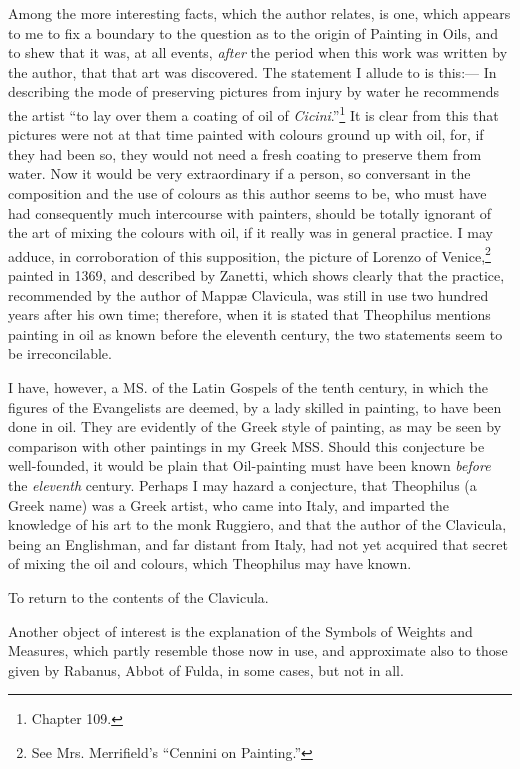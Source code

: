 \documentclass[a4paper, 11pt, oneside, polutonikogreek, italian]{article}
\begin{document}
Among the more interesting facts, which the author relates, is one, which appears to me to fix a boundary to the question as to the origin of Painting in Oils, and to shew that it was, at all events, \emph{after} the period when this work was written by the author, that that art was discovered. The statement I allude to is this:--- In describing the mode of preserving pictures from injury by water he recommends the artist ``to lay over them a coating of oil of \emph{Cicini}.''\footnote{Chapter 109.} It is clear from this that pictures were not at that time painted with colours ground up with oil, for, if they had been so, they would not need a fresh coating to preserve them from water. Now it would be very extraordinary if a person, so conversant in the composition and the use of colours as this author seems to be, who must have had consequently much intercourse with painters, should be totally ignorant of the art of mixing the colours with oil, if it really was in general practice. I may adduce, in corroboration of this supposition, the picture of Lorenzo of Venice,\footnote{See Mrs. Merrifield's ``Cennini on Painting.''} painted in 1369, and described by Zanetti, which shows clearly that the practice, recommended by the author of Mappæ Clavicula, was still in use two hundred years after his own time; therefore, when it is stated that Theophilus mentions painting in oil as known before the eleventh century, the two statements seem to be irreconcilable.

I have, however, a MS. of the Latin Gospels of the tenth century, in which the figures of the Evangelists are deemed, by a lady skilled in painting, to have been done in oil. They are evidently of the Greek style of painting, as may be seen by comparison with other paintings in my Greek MSS. Should this conjecture be well-founded, it would be plain that Oil-painting must have been known \emph{before} the \emph{eleventh} century. Perhaps I may hazard a conjecture, that Theophilus (a Greek name) was a Greek artist, who came into Italy, and imparted the knowledge of his art to the monk Ruggiero, and that the author of the Clavicula, being an Englishman, and far distant from Italy, had not yet acquired that secret of mixing the oil and colours, which Theophilus may have known.

To return to the contents of the Clavicula.

Another object of interest is the explanation of the Symbols of Weights and Measures, which partly resemble those now in use, and approximate also to those given by Rabanus, Abbot of Fulda, in some cases, but not in all.
\end{document}
